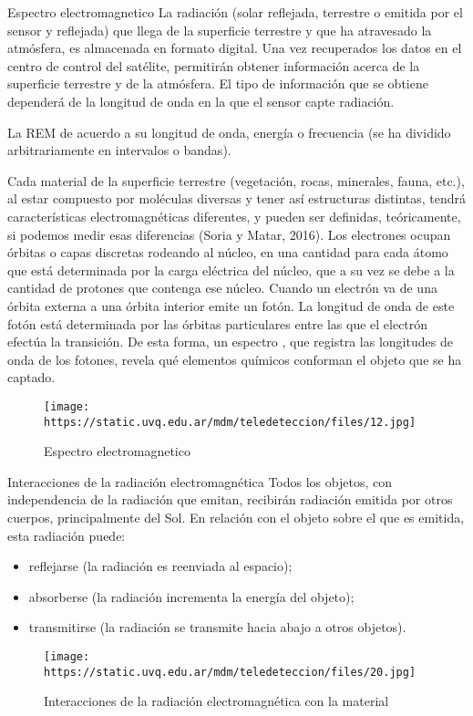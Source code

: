 \documentclass[
  ignorenonframetext,
]{beamer}
\providecommand{\tightlist}{%
  \setlength{\itemsep}{0pt}\setlength{\parskip}{0pt}}
\begin{document}
\begin{frame}{Espectro electromagnetico}
\protect\hypertarget{espectro-electromagnetico}{}
La radiación (solar reflejada, terrestre o emitida por el sensor y
reflejada) que llega de la superficie terrestre y que ha atravesado la
atmósfera, es almacenada en formato digital. Una vez recuperados los
datos en el centro de control del satélite, permitirán obtener
información acerca de la superficie terrestre y de la atmósfera. El tipo
de información que se obtiene dependerá de la longitud de onda en la que
el sensor capte radiación.

La REM de acuerdo a su longitud de onda, energía o frecuencia (se ha
dividido arbitrariamente en intervalos o bandas).

Cada material de la superficie terrestre (vegetación, rocas, minerales,
fauna, etc.), al estar compuesto por moléculas diversas y tener así
estructuras distintas, tendrá características electromagnéticas
diferentes, y pueden ser definidas, teóricamente, si podemos medir esas
diferencias (Soria y Matar, 2016). Los electrones ocupan órbitas o capas
discretas rodeando al núcleo, en una cantidad para cada átomo que está
determinada por la carga eléctrica del núcleo, que a su vez se debe a la
cantidad de protones que contenga ese núcleo. Cuando un electrón va de
una órbita externa a una órbita interior emite un fotón. La longitud de
onda de este fotón está determinada por las órbitas particulares entre
las que el electrón efectúa la transición. De esta forma, un espectro ,
que registra las longitudes de onda de los fotones, revela qué elementos
químicos conforman el objeto que se ha captado.

\begin{figure}
\centering
\texttt{[image: https://static.uvq.edu.ar/mdm/teledeteccion/files/12.jpg]}
\caption{Espectro electromagnetico}
\end{figure}
\end{frame}

\begin{frame}{Interacciones de la radiación electromagnética}
\protect\hypertarget{interacciones-de-la-radiaciuxf3n-electromagnuxe9tica}{}
Todos los objetos, con independencia de la radiación que emitan,
recibirán radiación emitida por otros cuerpos, principalmente del Sol.
En relación con el objeto sobre el que es emitida, esta radiación puede:

\begin{itemize}
\tightlist
\item
  reflejarse (la radiación es reenviada al espacio);
\item
  absorberse (la radiación incrementa la energía del objeto);
\item
  transmitirse (la radiación se transmite hacia abajo a otros objetos).
\end{itemize}

\begin{figure}
\centering
\texttt{[image: https://static.uvq.edu.ar/mdm/teledeteccion/files/20.jpg]}
\caption{Interacciones de la radiación electromagnética con la material}
\end{figure}
\end{frame}
\end{document}
